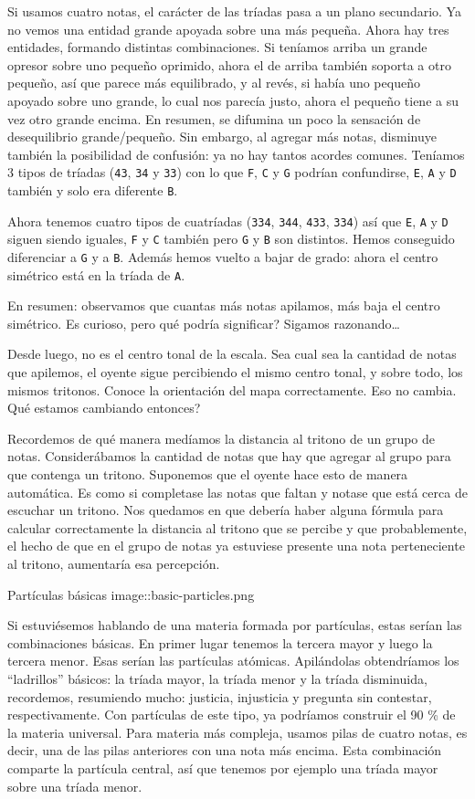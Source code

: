 \documentclass[]{article}
\begin{document}
Si usamos cuatro notas, el carácter de las tríadas pasa a un plano secundario. Ya no vemos una entidad grande apoyada sobre una más pequeña. Ahora hay tres entidades, formando distintas combinaciones. Si teníamos arriba un grande opresor sobre uno pequeño oprimido, ahora el de arriba también soporta a otro pequeño, así que parece más equilibrado, y al revés, si había uno pequeño apoyado sobre uno grande, lo cual nos parecía justo, ahora el pequeño tiene a su vez otro grande encima. En resumen, se difumina un poco la sensación de desequilibrio grande/pequeño. Sin embargo, al agregar más notas, disminuye también la posibilidad de confusión: ya no hay tantos acordes comunes. Teníamos 3 tipos de tríadas (\texttt{43}, \texttt{34} y \texttt{33}) con lo que \texttt{F}, \texttt{C} y \texttt{G} podrían confundirse, \texttt{E}, \texttt{A} y \texttt{D} también y solo era diferente \texttt{B}.

Ahora tenemos cuatro tipos de cuatríadas (\texttt{334}, \texttt{344}, \texttt{433}, \texttt{334}) así que \texttt{E}, \texttt{A} y \texttt{D} siguen siendo iguales, \texttt{F} y \texttt{C} también pero \texttt{G} y \texttt{B} son distintos. Hemos conseguido diferenciar a \texttt{G} y a \texttt{B}. Además hemos vuelto a bajar de grado: ahora el centro simétrico está en la tríada de \texttt{A}.

En resumen: observamos que cuantas más notas apilamos, más baja el centro simétrico. Es curioso, pero qué podría significar? Sigamos razonando\ldots{}

Desde luego, no es el centro tonal de la escala. Sea cual sea la cantidad de notas que apilemos, el oyente sigue percibiendo el mismo centro tonal, y sobre todo, los mismos tritonos. Conoce la orientación del mapa correctamente. Eso no cambia. Qué estamos cambiando entonces?

Recordemos de qué manera medíamos la distancia al tritono de un grupo de notas. Considerábamos la cantidad de notas que hay que agregar al grupo para que contenga un tritono. Suponemos que el oyente hace esto de manera automática. Es como si completase las notas que faltan y notase que está cerca de escuchar un tritono. Nos quedamos en que debería haber alguna fórmula para calcular correctamente la distancia al tritono que se percibe y que probablemente, el hecho de que en el grupo de notas ya estuviese presente una nota perteneciente al tritono, aumentaría esa percepción.

Partículas básicas image::basic-particles.png

Si estuviésemos hablando de una materia formada por partículas, estas serían las combinaciones básicas. En primer lugar tenemos la tercera mayor y luego la tercera menor. Esas serían las partículas atómicas. Apilándolas obtendríamos los ``ladrillos'' básicos: la tríada mayor, la tríada menor y la tríada disminuida, recordemos, resumiendo mucho: justicia, injusticia y pregunta sin contestar, respectivamente. Con partículas de este tipo, ya podríamos construir el 90 \% de la materia universal. Para materia más compleja, usamos pilas de cuatro notas, es decir, una de las pilas anteriores con una nota más encima. Esta combinación comparte la partícula central, así que tenemos por ejemplo una tríada mayor sobre una tríada menor.
\end{document}

